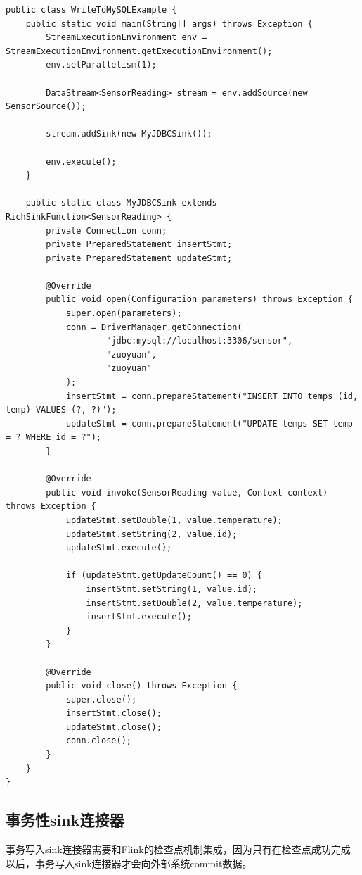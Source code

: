 \documentclass[cn,11pt,chinese]{elegantbook}
\begin{document}
\begin{verbatim}
public class WriteToMySQLExample {
    public static void main(String[] args) throws Exception {
        StreamExecutionEnvironment env = StreamExecutionEnvironment.getExecutionEnvironment();
        env.setParallelism(1);

        DataStream<SensorReading> stream = env.addSource(new SensorSource());

        stream.addSink(new MyJDBCSink());

        env.execute();
    }

    public static class MyJDBCSink extends RichSinkFunction<SensorReading> {
        private Connection conn;
        private PreparedStatement insertStmt;
        private PreparedStatement updateStmt;

        @Override
        public void open(Configuration parameters) throws Exception {
            super.open(parameters);
            conn = DriverManager.getConnection(
                    "jdbc:mysql://localhost:3306/sensor",
                    "zuoyuan",
                    "zuoyuan"
            );
            insertStmt = conn.prepareStatement("INSERT INTO temps (id, temp) VALUES (?, ?)");
            updateStmt = conn.prepareStatement("UPDATE temps SET temp = ? WHERE id = ?");
        }

        @Override
        public void invoke(SensorReading value, Context context) throws Exception {
            updateStmt.setDouble(1, value.temperature);
            updateStmt.setString(2, value.id);
            updateStmt.execute();

            if (updateStmt.getUpdateCount() == 0) {
                insertStmt.setString(1, value.id);
                insertStmt.setDouble(2, value.temperature);
                insertStmt.execute();
            }
        }

        @Override
        public void close() throws Exception {
            super.close();
            insertStmt.close();
            updateStmt.close();
            conn.close();
        }
    }
}
\end{verbatim}

\subsection{事务性sink连接器}

事务写入sink连接器需要和Flink的检查点机制集成，因为只有在检查点成功完成以后，事务写入sink连接器才会向外部系统commit数据。
\end{document}
